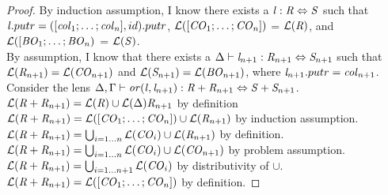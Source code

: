 \begin{lemma}
\begin{proof}
By induction assumption, I know
there exists a $\mathit{l} : \mathit{R} \Leftrightarrow \mathit{S}$ such that
$\mathit{l}.putr = ([\mathit{col}_1 ; \ldots ; \mathit{col}_n],id).putr$,
$\mathcal{L}([\mathit{CO}_1 ; \ldots ; \mathit{CO}_n])$ =
$\mathcal{L}(\mathit{R})$,
and $\mathcal{L}([\mathit{BO}_1 ; \ldots ; \mathit{BO}_n)$ = $\mathcal{L}(\mathit{S})$.\\
By assumption, I know that there exists a $\Delta \vdash \mathit{l}_{n+1} : \mathit{R}_{n+1} \Leftrightarrow \mathit{S}_{n+1}$ such that $\mathcal{L}(\mathit{R}_{n+1})=\mathcal{L}(\mathit{CO}_{n+1})$
and $\mathcal{L}(\mathit{S}_{n+1})=\mathcal{L}(\mathit{BO}_{n+1})$, where $\mathit{l}_{n+1}.putr=\mathit{col}_{n+1}$.\\
Consider the lens $\Delta, \Gamma \vdash \mathit{or}(\mathit{l},\mathit{l}_{n+1}) : \mathit{R}+\mathit{R}_{n+1} \Leftrightarrow \mathit{S}+\mathit{S}_{n+1}$.\\
$\mathcal{L}(\mathit{R}+\mathit{R}_{n+1})
= \mathcal{L}(\mathit{R})\cup\mathcal{L}(\Delta){\mathit{R}_{n+1}}$
by definition\\
$\mathcal{L}(\mathit{R}+\mathit{R}_{n+1})
= \mathcal{L}([\mathit{CO}_1; \ldots ; \mathit{CO}_n])
\cup\mathcal{L}(\mathit{R}_{n+1})$ by induction assumption.\\
$\mathcal{L}(\mathit{R}+\mathit{R}_{n+1})
= \bigcup_{i=1\ldots n}\mathcal{L}(\mathit{CO}_i)
\cup\mathcal{L}(\mathit{R}_{n+1})$ by definition.\\
$\mathcal{L}(\mathit{R}+\mathit{R}_{n+1})
= \bigcup_{i=1\ldots n}\mathcal{L}(\mathit{CO}_i)
\cup\mathcal{L}(\mathit{CO}_{n+1})$ by problem assumption.\\
$\mathcal{L}(\mathit{R}+\mathit{R}_{n+1})
= \bigcup_{i=1\ldots n+1}\mathcal{L}(\mathit{CO}_i)$ by distributivity of $\cup$.\\
$\mathcal{L}(\mathit{R}+\mathit{R}_{n+1})
= \mathcal{L}([\mathit{CO}_1; \ldots ; \mathit{CO}_n])$ by definition.


\end{proof}
\end{lemma}
